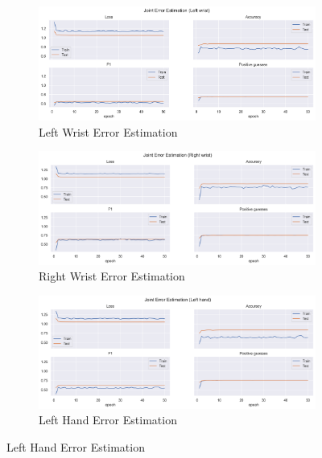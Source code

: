\begin{figure}[!htbp]
  \centering
  \begin{subfigure}[b]{0.47\linewidth}
      \centering
      \includegraphics[width=\textwidth]{figures/Results/v1/jt/Left wrist_ErrorEstimation.png}
      \caption{Left Wrist Error Estimation}
      \label{fig:v1_lewr_jt_ee}
  \end{subfigure}
  \hfill
  \begin{subfigure}[b]{0.47\linewidth}
      \centering
      \includegraphics[width=\textwidth]{figures/Results/v1/jt/Right wrist_ErrorEstimation.png}
      \caption{Right Wrist Error Estimation}
      \label{fig:v1_riwr_jt_ee}
  \end{subfigure}
  \hfill
  \begin{subfigure}[b]{0.47\linewidth}
      \centering
      \includegraphics[width=\textwidth]{figures/Results/v1/jt/Left hand_ErrorEstimation.png}
      \caption{Left Hand Error Estimation}

\end{subfigure}
\end{figure}
